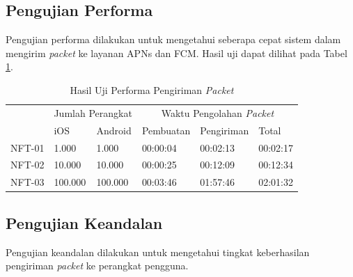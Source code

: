 \subsection{Pengujian Performa}
\par Pengujian performa dilakukan untuk mengetahui seberapa cepat sistem dalam mengirim \textit{packet} ke layanan APNs dan FCM. Hasil uji dapat dilihat pada Tabel \ref{t:performa}.
\begin{longtable}{|p{1.3cm}|p{1.3cm}|p{1.3cm}|p{1.8cm}|p{1.8cm}|p{1.8cm}|}
	\caption{Hasil Uji Performa Pengiriman \textit{Packet}} \label{t:performa} \\ \hline
	\rowcolor{lightgray} & \multicolumn{2}{c|}{Jumlah Perangkat} & \multicolumn{3}{c|}{Waktu Pengolahan \textit{Packet}} \\ \hhline{~|*5{-}|}
	\rowcolor{lightgray} \multirow{-2}{*}{Kode} & iOS & Android & Pembuatan & Pengiriman & Total \\ \hline
	NFT-01 & 1.000 & 1.000 & 00:00:04 & 00:02:13 & 00:02:17 \\ \hline
	NFT-02 & 10.000 & 10.000 & 00:00:25 & 00:12:09 & 00:12:34 \\ \hline
	NFT-03 & 100.000 & 100.000 & 00:03:46 & 01:57:46 & 02:01:32 \\ \hline
\end{longtable}

\subsection{Pengujian Keandalan}
\par Pengujian keandalan dilakukan untuk mengetahui tingkat keberhasilan pengiriman \textit{packet} ke perangkat pengguna.

